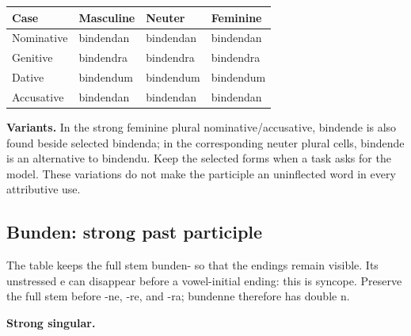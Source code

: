 \par\begingroup
\fontsize{10.5}{13.2}\selectfont
\setlength{\LTleft}{0pt}\setlength{\LTright}{\fill}
\noindent
\begin{tabular}{@{}>{\raggedright\arraybackslash}p{22.0mm}>{\raggedright\arraybackslash}p{31.188mm}>{\raggedright\arraybackslash}p{31.188mm}>{\raggedright\arraybackslash}p{31.188mm}@{}}
\toprule
\textbf{Case} & \textbf{Masculine} & \textbf{Neuter} & \textbf{Feminine} \\
\midrule
Nominative & bindendan & bindendan & bindendan \\
Genitive & bindendra & bindendra & bindendra \\
Dative & bindendum & bindendum & bindendum \\
Accusative & bindendan & bindendan & bindendan \\
\bottomrule
\end{tabular}
\par\endgroup
\textbf{Variants.} In the strong feminine plural nominative/\allowbreak{}accusative, bindende is also found beside selected bindenda; in the corresponding neuter plural cells, bindende is an alternative to bindendu. Keep the selected forms when a task asks for the model. These variations do not make the participle an uninflected word in every attributive use.

\subsection*{Bunden: strong past participle}

The table keeps the full stem bunden- so that the endings remain visible. Its unstressed e can disappear before a vowel-initial ending: this is syncope. Preserve the full stem before -ne, -re, and -ra; bundenne therefore has double n.

\textbf{Strong singular.}

